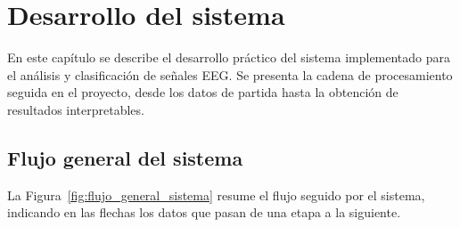 
\chapter{Desarrollo del sistema}
\label{cap:desarrollo_sistema}

En este capítulo se describe el desarrollo práctico del sistema implementado para el análisis y clasificación de señales \ac{EEG}. Se presenta la cadena de procesamiento seguida en el proyecto, desde los datos de partida hasta la obtención de resultados interpretables.


\section{Flujo general del sistema}

La Figura~\ref{fig:flujo_general_sistema} resume el flujo seguido por el sistema, indicando en las flechas los datos que pasan de una etapa a la siguiente.

